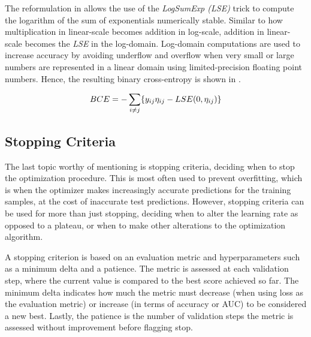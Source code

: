        The reformulation in  allows the use of the \emph{LogSumExp (LSE)} trick to compute the logarithm of the sum of exponentials numerically stable. Similar to how multiplication in linear-scale becomes addition in log-scale, addition in linear-scale becomes the \emph{LSE} in the log-domain. Log-domain computations are used to increase accuracy by avoiding underflow and overflow when very small or large numbers are represented in a linear domain using limited-precision floating point numbers. Hence, the resulting binary cross-entropy is shown in .
        
        \begin{equation}\label{eq:bce-log-domain-rewrite}
            BCE = -\sum_{i\neq j}\{ \sub(y) \sub(\eta) - LSE(0,\sub(\eta)) \}
        \end{equation}
    
    \subsection{Stopping Criteria}
    
        The last topic worthy of mentioning is stopping criteria, deciding when to stop the optimization procedure. This is most often used to prevent overfitting, which is when the optimizer makes increasingly accurate predictions for the training samples, at the cost of inaccurate test predictions. However, stopping criteria can be used for more than just stopping, deciding when to alter the learning rate as opposed to a plateau, or when to make other alterations to the optimization algorithm. 
        
        A stopping criterion is based on an evaluation metric and hyperparameters such as a minimum delta and a patience. The metric is assessed at each validation step, where the current value is compared to the best score achieved so far. The minimum delta indicates how much the metric must decrease (when using loss as the evaluation metric) or increase (in terms of accuracy or AUC) to be considered a new best. Lastly, the patience is the number of validation steps the metric is assessed without improvement before flagging stop.

